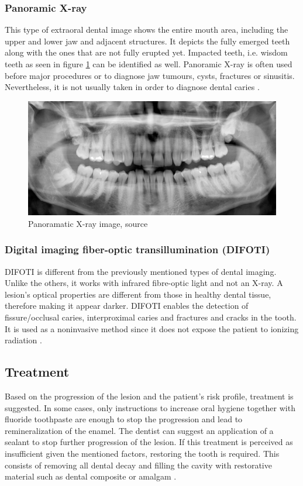 \subsubsection{Panoramic X-ray}
This type of extraoral dental image shows the entire mouth area, including the upper and lower jaw and adjacent structures. It depicts the fully emerged teeth along with the ones that are not fully erupted yet. Impacted teeth, i.e. wisdom teeth as seen in figure \ref{fig:panoramatic_xray} can be identified as well. Panoramic X-ray is often used before major procedures or to diagnose jaw tumours, cysts, fractures or sinusitis. Nevertheless, it is not usually taken in order to diagnose dental caries \cite{clevland_xray}.

\begin{figure}
    \centering
    \includegraphics[width=\linewidth]{images/panoramatic_xray.jpg}
    \caption{Panoramatic X-ray image, source \cite{Panoramatic2017}}
    \label{fig:panoramatic_xray}
\end{figure}


\subsubsection{Digital imaging fiber-optic transillumination (DIFOTI)}
DIFOTI is different from the previously mentioned types of dental imaging. Unlike the others, it works with infrared fibre-optic light and not an X-ray. A lesion's optical properties are different from those in healthy dental tissue, therefore making it appear darker. DIFOTI enables the detection of fissure/occlusal caries, interproximal caries and fractures and cracks in the tooth. It is used as a noninvasive method since it does not expose the patient to ionizing radiation \cite{Strassler2014}.

\subsection{Treatment}
Based on the progression of the lesion and the patient's risk profile, treatment is suggested. In some cases, only instructions to increase oral hygiene together with fluoride toothpaste are enough to stop the progression and lead to remineralization of the enamel. The dentist can suggest an application of a sealant to stop further progression of the lesion. If this treatment is perceived as insufficient given the mentioned factors, restoring the tooth is required. This consists of removing all dental decay and filling the cavity with restorative material such as dental composite or amalgam \cite{2019a}\cite{2015}.

